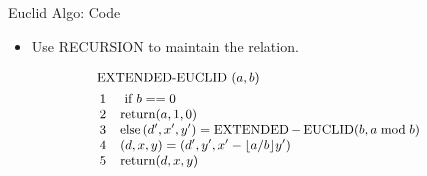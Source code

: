 \begin{frame}{Euclid Algo: Code}
    \begin{itemize}
        \item Use RECURSION to maintain the relation.
    \end{itemize}
    $$
    \small
\begin{aligned}
&\text { EXTENDED-EUCLID }(a, b)\\
&\begin{array}{ll}
1 & \text { if } b==0 \\
2 & \operatorname{return}(a, 1,0) \\
3 & \operatorname{else}\left(d^{\prime}, x^{\prime}, y^{\prime}\right)=\operatorname{EXTENDED}-\operatorname{EUCLID}(b, a \bmod b) \\
4 & (d, x, y)=\left(d^{\prime}, y^{\prime}, x^{\prime}-\lfloor a / b\rfloor y^{\prime}\right) \\
5 & \operatorname{return}(d, x, y)
\end{array}
\end{aligned}
$$


\end{frame}
